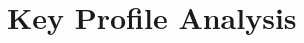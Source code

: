 \documentclass{article}
\begin{document}

\section{Key Profile Analysis}\label{keyprof}
\end{document}
